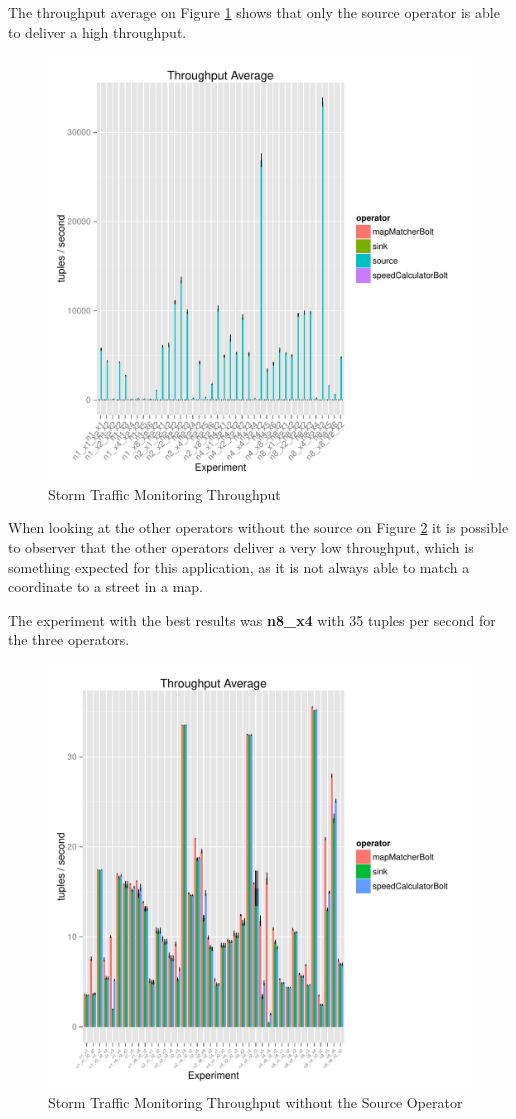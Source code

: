 \documentclass[ppgc,diss,english]{iiufrgs}
\begin{document}
The throughput average on Figure \ref{fig:storm_trafficmonitoring_throughput} shows that only the source operator is able to deliver a high throughput.

\begin{figure}[H]
    \centering
	\includegraphics[width=.6\textwidth]{summaries/storm_trafficmonitoring/full_throughput.pdf}
	\caption{Storm Traffic Monitoring Throughput}
	\label{fig:storm_trafficmonitoring_throughput}
\end{figure}

When looking at the other operators without the source on Figure \ref{fig:storm_trafficmonitoring_throughput2} it is possible to observer that the other operators deliver a very low throughput, which is something expected for this application, as it is not always able to match a coordinate to a street in a map.

The experiment with the best results was \textbf{n8\_x4} with 35 tuples per second for the three operators.

\begin{figure}[H]
    \centering
	\includegraphics[width=.6\textwidth]{summaries/storm_trafficmonitoring/throughput2.pdf}
	\caption{Storm Traffic Monitoring Throughput without the Source Operator}
	\label{fig:storm_trafficmonitoring_throughput2}
\end{figure}
\end{document}
